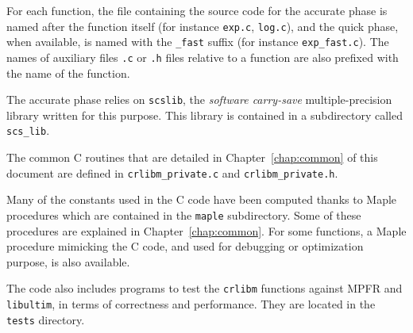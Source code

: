 For each function, the file containing the source code for the
accurate phase is named after the function itself (for instance
\texttt{exp.c}, \texttt{log.c}), and the quick phase, when available,
is named with the \texttt{\_fast} suffix (for instance
\texttt{exp\_fast.c}). The names of auxiliary files \texttt{.c} or
\texttt{.h} files relative to a function are also prefixed with the
name of the function.

The accurate phase relies on \texttt{scslib}, the \emph{software
  carry-save} multiple-precision library written for this purpose.
This library is contained in a subdirectory called \texttt{scs\_lib}.

The common C routines that are detailed in Chapter~\ref{chap:common} of
this document are defined in \texttt{crlibm\_private.c} and
\texttt{crlibm\_private.h}.

Many of the constants used in the C code have been computed thanks to
Maple procedures which are contained in the \texttt{maple}
subdirectory. Some of these procedures are explained in
Chapter~\ref{chap:common}. For some functions, a Maple procedure
mimicking the C code, and used for debugging or optimization purpose,
is also available.


The code also includes programs to test the \texttt{crlibm} functions
against MPFR and \texttt{libultim}, in terms of correctness and
performance. They are located in the \texttt{tests} directory.

